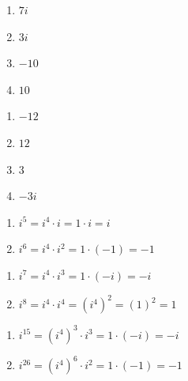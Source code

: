 \documentclass{ximera}
\begin{document}
\begin{multicols}{4}
\begin{enumerate}
\setcounter{enumi}{\value{HW}}

\item $7i$
\item $3i$

\item $-10$
\item $10$

\setcounter{HW}{\value{enumi}}
\end{enumerate}
\end{multicols}

\begin{multicols}{4}
\begin{enumerate}
\setcounter{enumi}{\value{HW}}

\item $-12$
\item $12$

\item $3$
\item $-3i$

\setcounter{HW}{\value{enumi}}
\end{enumerate}
\end{multicols}

\begin{multicols}{2}
\begin{enumerate}
\setcounter{enumi}{\value{HW}}

\item $i^{5} = i^{4} \cdot i = 1 \cdot i = i$
\item $i ^{6} =  i^{4} \cdot i^{2} = 1 \cdot (-1) = -1$
\setcounter{HW}{\value{enumi}}
\end{enumerate}
\end{multicols}

\begin{multicols}{2}
\begin{enumerate}
\setcounter{enumi}{\value{HW}}


\item $i^{7} = i^{4} \cdot i^{3} = 1 \cdot (-i) = -i$
\item $i^{8} = i^{4} \cdot i^{4} = \left(i^{4}\right)^{2} = (1)^{2} =1$

\setcounter{HW}{\value{enumi}}
\end{enumerate}
\end{multicols}

\begin{multicols}{2}
\begin{enumerate}
\setcounter{enumi}{\value{HW}}

\item $i^{15} = \left(i^{4}\right)^{3} \cdot i^{3} = 1 \cdot (-i) = -i$
\item $i ^{26} = \left(i^{4}\right)^{6} \cdot i^{2} = 1\cdot (-1) = -1$

\setcounter{HW}{\value{enumi}}
\end{enumerate}
\end{multicols}
\end{document}

